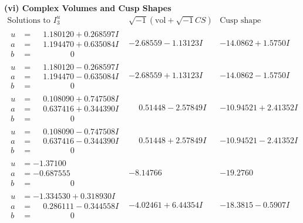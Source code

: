 \documentclass[1p]{elsarticle_modified}
\theoremstyle{definition}
\newcommand{\I}{\sqrt{-1}}
\begin{document}
\newpage\flushleft \textbf{(vi) Complex Volumes and Cusp Shapes}
$$\begin{array}{c|c|c}  
\text{Solutions to }I^u_{3}& \I (\text{vol} + \sqrt{-1}CS) & \text{Cusp shape}\\
 \hline 
\begin{aligned}
u &= \phantom{-}1.180120 + 0.268597 I \\
a &= \phantom{-}1.194470 + 0.635084 I \\
b &= \phantom{-0.000000 } 0\end{aligned}
 & -2.68559 - 1.13123 I & -14.0862 + 1.5750 I \\ \hline\begin{aligned}
u &= \phantom{-}1.180120 - 0.268597 I \\
a &= \phantom{-}1.194470 - 0.635084 I \\
b &= \phantom{-0.000000 } 0\end{aligned}
 & -2.68559 + 1.13123 I & -14.0862 - 1.5750 I \\ \hline\begin{aligned}
u &= \phantom{-}0.108090 + 0.747508 I \\
a &= \phantom{-}0.637416 + 0.344390 I \\
b &= \phantom{-0.000000 } 0\end{aligned}
 & \phantom{-}0.51448 - 2.57849 I & -10.94521 + 2.41352 I \\ \hline\begin{aligned}
u &= \phantom{-}0.108090 - 0.747508 I \\
a &= \phantom{-}0.637416 - 0.344390 I \\
b &= \phantom{-0.000000 } 0\end{aligned}
 & \phantom{-}0.51448 + 2.57849 I & -10.94521 - 2.41352 I \\ \hline\begin{aligned}
u &= -1.37100\phantom{ +0.000000I} \\
a &= -0.687555\phantom{ +0.000000I} \\
b &= \phantom{-0.000000 } 0\end{aligned}
 & -8.14766\phantom{ +0.000000I} & -19.2760\phantom{ +0.000000I} \\ \hline\begin{aligned}
u &= -1.334530 + 0.318930 I \\
a &= \phantom{-}0.286111 - 0.344558 I \\
b &= \phantom{-0.000000 } 0\end{aligned}
 & -4.02461 + 6.44354 I & -18.3815 - 0.5907 I \\ \hline\begin{aligned}

\end{aligned}
\end{array}$$
\end{document}
